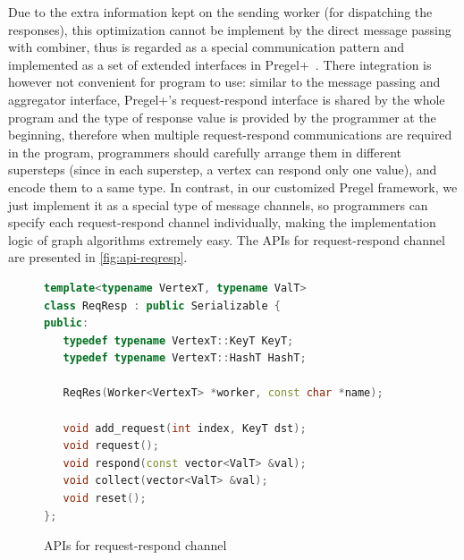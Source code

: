 \documentclass{sokendai_thesis} %
\begin{document}
Due to the extra information kept on the sending worker (for dispatching the responses), this optimization cannot be implement by the direct message passing with combiner, thus is regarded as a special communication pattern and implemented as a set of extended interfaces in Pregel+~\cite{pregelplus}.
There integration is however not convenient for program to use:
similar to the message passing and aggregator interface, Pregel+'s request-respond interface is shared by the whole program and the type of response value is provided by the programmer at the beginning, therefore when multiple request-respond communications are required in the program, programmers should carefully arrange them in different supersteps (since in each superstep, a vertex can respond only one value), and encode them to a same type.
In contrast, in our customized Pregel framework, we just implement it as a special type of message channels, so programmers can specify each request-respond channel individually, making the implementation logic of graph algorithms extremely easy.
The APIs for request-respond channel are presented in \autoref{fig:api-reqresp}.

\begin{figure}[ht]
\centering
\vspace{-2ex}
\begin{lstlisting}[basicstyle=\small\ttfamily,numbers=none,language=c++]
template<typename VertexT, typename ValT>
class ReqResp : public Serializable {
public:
   typedef typename VertexT::KeyT KeyT;
   typedef typename VertexT::HashT HashT;

   ReqRes(Worker<VertexT> *worker, const char *name);

   void add_request(int index, KeyT dst);
   void request();
   void respond(const vector<ValT> &val);
   void collect(vector<ValT> &val);
   void reset();
};
\end{lstlisting}
\vspace{-2ex}
\caption{APIs for request-respond channel}
\label{fig:api-reqresp}
\end{figure}
\end{document}

